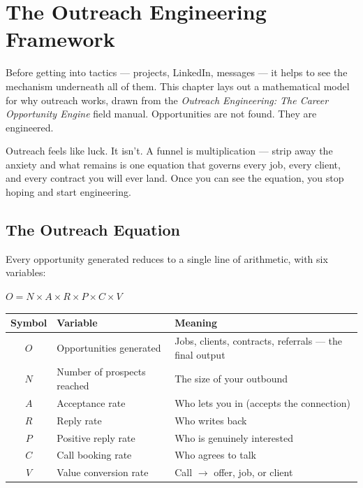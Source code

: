 \chapter{The Outreach Engineering Framework}
\label{ch:outreach-engineering}

Before getting into tactics --- projects, LinkedIn, messages --- it helps to see the mechanism underneath all of
them. This chapter lays out a mathematical model for why outreach works, drawn from the \emph{Outreach
Engineering: The Career Opportunity Engine} field manual. Opportunities are not found. They are engineered.

\begin{keytakeaway}
Outreach feels like luck. It isn't. A funnel is multiplication --- strip away the anxiety and what remains is one
equation that governs every job, every client, and every contract you will ever land. Once you can see the
equation, you stop hoping and start engineering.
\end{keytakeaway}

\section{The Outreach Equation}

Every opportunity generated reduces to a single line of arithmetic, with six variables:

\begin{center}
\Large $O = N \times A \times R \times P \times C \times V$
\end{center}

\begin{longtable}{c p{} p{}}
\toprule
\textbf{Symbol} & \textbf{Variable} & \textbf{Meaning} \\
\midrule
\endhead
$O$ & Opportunities generated & Jobs, clients, contracts, referrals --- the final output \\
$N$ & Number of prospects reached & The size of your outbound \\
$A$ & Acceptance rate & Who lets you in (accepts the connection) \\
$R$ & Reply rate & Who writes back \\
$P$ & Positive reply rate & Who is genuinely interested \\
$C$ & Call booking rate & Who agrees to talk \\
$V$ & Value conversion rate & Call $\rightarrow$ offer, job, or client \\
\bottomrule
\end{longtable}

